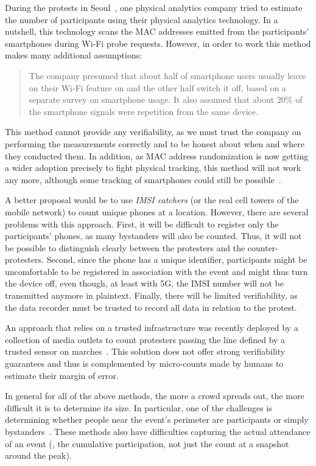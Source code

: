 During the protests in Seoul~\cite{2016DemonstrationsInSeoul}, one physical analytics company tried to estimate the number of participants using their physical analytics technology.
In a nutshell, this technology scans the MAC addresses emitted from the participants' smartphones during Wi-Fi probe requests.
However, in order to work this method makes many additional assumptions:
\blockcquote{2016DemonstrationsInSeoul}{%
The company presumed that about half of smartphone users usually leave on their Wi-Fi feature on and the other half switch it off, based on a separate survey on smartphone usage. 
It also assumed that about 20\% of the smartphone signals were repetition from the same device.
}
This method cannot provide any verifiability, as we must trust the company on performing the measurements correctly and to be honest about when and where they conducted them.
In addition, as MAC address randomization is now getting a wider adoption precisely to fight physical tracking, this method will not work any more, although some tracking of smartphones could still be possible~\cite{WhyMACRandomizationIsNotEnough}.

A better proposal would be to use \emph{IMSI catchers} (or the real cell towers of the mobile network) to count unique phones at a location.
However, there are several problems with this approach.
First, it will be difficult to register only the participants' phones, as many bystanders will also be counted.
Thus, it will not be possible to distinguish clearly between the protesters and the counter-protesters.
Second, since the phone has a unique identifier, participants might be uncomfortable to be registered in association with the event and might thus turn the device off, even though, at least with 5G, the IMSI number will not be transmitted anymore in plaintext. %
Finally, there will be limited verifiability, as the data recorder must be trusted to record all data in relation to the protest.

An approach that relies on a trusted infrastructure was recently deployed by a collection of media outlets to count protesters passing the line defined by a trusted sensor on marches~\cite{LeMondeProtestingSolution}. 
This solution does not offer strong verifiability guarantees and thus is complemented by micro-counts made by humans to estimate their margin of error.

In general for all of the above methods, the more a crowd spreads out, the more difficult it is to determine its size.
In particular, one of the challenges is determining whether people near the event's perimeter are participants or simply bystanders~\cite{HowToEstimateCrowdSize}.
These methods also have difficulties capturing the actual attendance of an event (\ie, the cumulative participation, not just the count at a snapshot around the peak).

